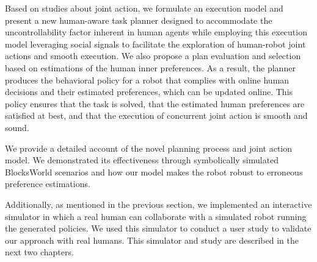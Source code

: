 Based on studies about joint action, we formulate an execution model and present a new human-aware task planner designed to accommodate the uncontrollability factor inherent in human agents while employing this execution model leveraging social signals to facilitate the exploration of human-robot joint actions and smooth execution. 
We also propose a plan evaluation and selection based on estimations of the human inner preferences.
As a result, the planner produces the behavioral policy for a robot that complies with online human decisions and their estimated preferences, which can be updated online. This policy 
ensures that the task is solved, that the estimated human preferences are satisfied at best, and that the execution of concurrent joint action is smooth and sound.

We provide a detailed account of the novel planning process and joint action model. We demonstrated its effectiveness through symbolically simulated BlocksWorld scenarios and how our model makes the robot robust to erroneous preference estimations.

Additionally, as mentioned in the previous section, we implemented an interactive simulator in which a real human can collaborate with a simulated robot running the generated policies. We used this simulator to conduct a user study to validate our approach with real humans. This simulator and study are described in the next two chapters.  
